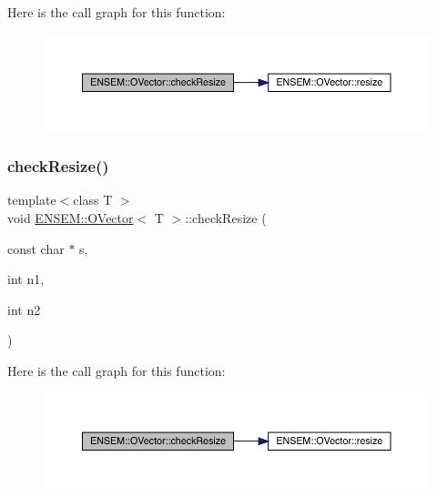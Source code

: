 Here is the call graph for this function\+:
\nopagebreak
\begin{figure}[H]
\begin{center}
\leavevmode
\includegraphics[width=350pt]{d0/d8d/classENSEM_1_1OVector_a95545451bb9d6be83ba32ad3dc2dab42_cgraph}
\end{center}
\end{figure}
\mbox{\label{classENSEM_1_1OVector_acd8960fbc5b7df8aabf14ca8ca50f7ab}} 
\subsubsection{\texorpdfstring{checkResize()}{checkResize()}\hspace{0.1cm}{\footnotesize\ttfamily [3/6]}}
{\footnotesize\ttfamily template$<$class T $>$ \\
void \mbox{\hyperlink{classENSEM_1_1OVector}{E\+N\+S\+E\+M\+::\+O\+Vector}}$<$ T $>$\+::check\+Resize (\begin{DoxyParamCaption}\item[{const char $\ast$}]{s,  }\item[{int}]{n1,  }\item[{int}]{n2 }\end{DoxyParamCaption})\hspace{0.3cm}{\ttfamily [inline]}}

Here is the call graph for this function\+:
\nopagebreak
\begin{figure}[H]
\begin{center}
\leavevmode
\includegraphics[width=350pt]{d0/d8d/classENSEM_1_1OVector_acd8960fbc5b7df8aabf14ca8ca50f7ab_cgraph}
\end{center}
\end{figure}
\mbox{\label{classENSEM_1_1OVector_acd8960fbc5b7df8aabf14ca8ca50f7ab}} 
